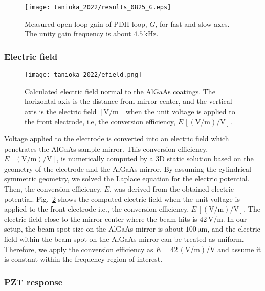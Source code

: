 \begin{figure}[htbp]
    \centering
\texttt{[image: tanioka\_2022/results\_0825\_G.eps]}
\caption{
Measured open-loop gain of PDH loop, $G$, for fast and slow axes. The unity gain frequency is about $4.5\, \mathrm{kHz}$.
}
\label{fig.rawOLG}
\end{figure}

\subsubsection{Electric field}

\begin{figure}[htbp]
\texttt{[image: tanioka\_2022/efield.png]}
\caption{
Calculated electric field normal to the AlGaAs coatings.
The horizontal axis is the distance from mirror center, and the vertical axis is the electric field $\mathrm{[V/m]}$ when the unit voltage is applied to the front electrode, i.e, the conversion efficiency, $E\, \mathrm{[(V/m)/V]}$.
}
\label{fig.efield}
\end{figure}

Voltage applied to the electrode is converted into an electric field which penetrates the AlGaAs sample mirror.
This conversion efficiency, $E\, \mathrm{[(V/m)/V]}$, is numerically computed by a 3D static solution based on the geometry of the electrode and the AlGaAs mirror.
By assuming the cylindrical symmetric geometry, we solved the Laplace equation for the electric potential.
Then, the conversion efficiency, $E$, was derived from the obtained electric potential.
Fig.~\ref{fig.efield} shows the computed electric field when the unit voltage is applied to the front electrode i.e., the conversion efficiency, $E\, \mathrm{[(V/m)/V]}$.
The electric field close to the mirror center where the beam hits is $42\, \mathrm{V/m}$.
In our setup, the beam spot size on the AlGaAs mirror is about $100\, \mathrm{\mu m}$, and the electric field within the beam spot on the AlGaAs mirror can be treated as uniform.
Therefore, we apply the conversion efficiency as $E = 42\, \mathrm{(V/m)/V}$ and assume it is constant within the frequency region of interest.

\subsubsection{PZT response}

